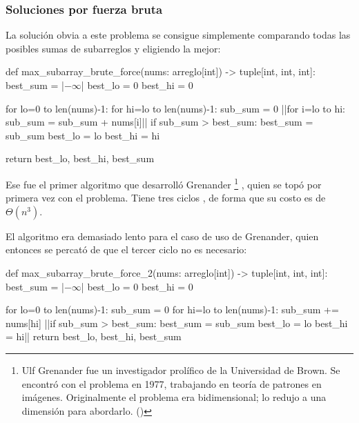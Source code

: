 \subsubsection{Soluciones por fuerza bruta}
\label{sec:subarreglo_max_fuerza_bruta}

La solución obvia a este problema se consigue simplemente comparando todas las posibles sumas de subarreglos y eligiendo la mejor:
\begin{codeblock}
\begin{pseudocode}
def max_subarray_brute_force(nums: arreglo[int]) -> tuple[int, int, int]:
    best_sum = |\(-\infty\)|
    best_lo = 0
    best_hi = 0

    for lo=0 to len(nums)-1:
        for hi=lo to len(nums)-1:
        sub_sum = 0
        ||for i=lo to hi:
            sub_sum = sub_sum + nums[i]||
        if sub_sum > best_sum:
            best_sum = sub_sum
            best_lo = lo
            best_hi = hi
    
    return best_lo, best_hi, best_sum
\end{pseudocode}
\begin{annotations}
\end{annotations}
\end{codeblock}

Ese fue el primer algoritmo que desarrolló Grenander%
\footnote{Ulf Grenander fue un investigador prolífico de la Universidad de Brown. Se encontró con el problema en 1977, trabajando en teoría de patrones en imágenes. Originalmente el problema era bidimensional; lo redujo a una dimensión para abordarlo. (\cite{bentley})
}%
, quien se topó por primera vez con el problema. Tiene tres ciclos , de forma que su costo es de \(\Theta(n^3)\). 

El algoritmo era demasiado lento para el caso de uso de Grenander, quien entonces se percató de que el tercer ciclo no es necesario:
\label{sec:subarreglo_max_fuerza_bruta_2}
\begin{codeblock}
\begin{pseudocode}
def max_subarray_brute_force_2(nums: arreglo[int]) -> tuple[int, int, int]:
    best_sum = |\(-\infty\)|
    best_lo = 0
    best_hi = 0

    for lo=0 to len(nums)-1:
        sub_sum = 0
        for hi=lo to len(nums)-1:
            sub_sum += nums[hi]
            ||if sub_sum > best_sum:
                best_sum = sub_sum
                best_lo = lo
                best_hi = hi||
    return best_lo, best_hi, best_sum
\end{pseudocode}
\begin{annotations}
\end{annotations}
\end{codeblock}

